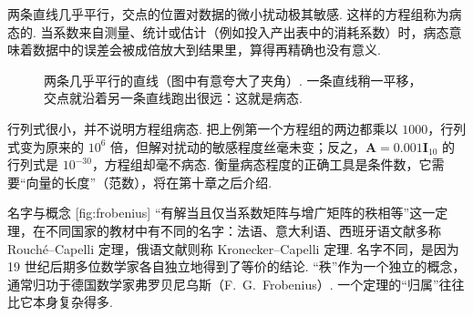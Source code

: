 \documentclass[lang=cn,10.5pt,scheme=chinese,toc=twocol,section,chinesefont=nofont,
twoside,citestyle=gb7714-2015,bibstyle=gb7714-2015]{elegantbook}
\DeclareRobustCommand{\textbf}[1]{{\lnsemiboldlatin\lnsemiboldcjk #1}}
\newcommand{\vv}[1]{\boldsymbol{#1}}
\numberwithin{equation}{section}   %
\begin{document}
两条直线几乎平行，交点的位置对数据的微小扰动极其敏感. 这样的方程组称为\textbf{病态}的. 当系数来自测量、统计或估计（例如投入产出表中的消耗系数）时，病态意味着\textbf{数据中的误差会被成倍放大到结果里}，算得再精确也没有意义.
\begin{figure}[htbp]
  \centering
  \caption{两条几乎平行的直线（图中有意夸大了夹角）. 一条直线稍一平移，交点就沿着另一条直线跑出很远：这就是病态.}
  \label{fig:illcond}
\end{figure}
\begin{pitfallbox}
  行列式很小，并\textbf{不}说明方程组病态. 把上例第一个方程组的两边都乘以 $1000$，行列式变为原来的 $10^6$ 倍，但解对扰动的敏感程度丝毫未变；反之，$\vv A=0.001\vv I_{10}$ 的行列式是 $10^{-30}$，方程组却毫不病态. 衡量病态程度的正确工具是\textbf{条件数}，它需要“向量的长度”（范数），将在第十章之后介绍.
\end{pitfallbox}

\begin{historybox}{名字与概念}
  [fig:frobenius]
  “有解当且仅当系数矩阵与增广矩阵的秩相等”这一定理，在不同国家的教材中有不同的名字：法语、意大利语、西班牙语文献多称 Rouché–Capelli 定理，俄语文献则称 Kronecker–Capelli 定理. 名字不同，是因为 19 世纪后期多位数学家各自独立地得到了等价的结论\cite{rouche1875discussion}. “秩”作为一个独立的概念，通常归功于德国数学家弗罗贝尼乌斯（F.~G.~Frobenius）\cite{frobenius1879homogene}. 一个定理的“归属”往往比它本身复杂得多.
\end{historybox}
\end{document}
